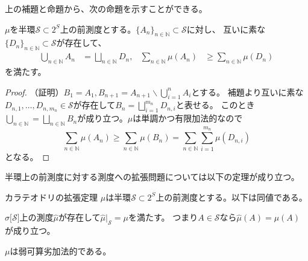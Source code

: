 \documentclass[../root.tex]{subfiles}
\begin{document}
上の補題と命題から、次の命題を示すことができる。

\begin{Prop}{}{}
$ \mu $を半環$ \mathscr{S}\subset 2^{S} $上の前測度とする。$ \lbrace A_{n} \rbrace_{n\in\mathbb{N}}\subset\mathscr{S} $に対し、
互いに素な$ \lbrace D_{n} \rbrace_{n\in\mathbb{N}}\subset\mathscr{S} $が存在して、
\begin{align*}
\bigcup_{n\in\mathbb{N}}A_{n}&=\bigsqcup_{n\in\mathbb{N}}D_{n}, & \sum_{n\in\mathbb{N}}\mu( A_{n} )&\ge\sum_{n\in\mathbb{N}}\mu( D_{n} )
\end{align*}
を満たす。
\end{Prop}

\begin{proof}
（証明）$ B_{1}=A_{1}, B_{n+1}=A_{n+1}\backslash \bigcup_{i=1}^{n}A_{i} $とする。
補題より互いに素な$ D_{n, 1}, \dotsc, D_{n, m_{n}}\in\mathscr{S} $が存在して$ B_{n}=\bigsqcup_{i=1}^{m_{n}}D_{n, i} $と表せる。
このとき$ \bigcup_{n\in\mathbb{N}}=\bigsqcup_{n\in\mathbb{N}}B_{n} $が成り立つ。$ \mu $は単調かつ有限加法的なので
\[ \sum_{n\in\mathbb{N}}\mu( A_{n} )\ge\sum_{n\in\mathbb{N}}\mu( B_{n} )=\sum_{n\in\mathbb{N}}\sum_{i=1}^{m_{n}}\mu( D_{n, i} ) \]
となる。
\end{proof}

半環上の前測度に対する測度への拡張問題については以下の定理が成り立つ。

\begin{Thm}{カラテオドリの拡張定理}{}
$ \mu $は半環$ \mathscr{S}\subset 2^{S} $上の前測度とする。以下は同値である。
\begin{EnumEquiv}
\item $ \sigma\lbrack \mathscr{S} \rbrack $上の測度$ \widehat{\mu} $が存在して$ \widehat{\mu}|_{\mathscr{S}}=\mu $を満たす。
つまり$ A\in\mathscr{S} $なら$ \widehat{\mu}( A )=\mu( A ) $が成り立つ。
\item $ \mu $は弱可算劣加法的である。
\end{EnumEquiv}
\end{Thm}
\end{document}
